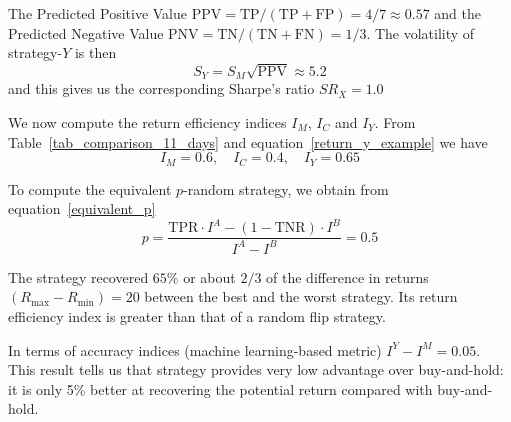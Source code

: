 \documentclass{article}
\begin{document}
The Predicted Positive Value $\text{PPV}=\text{TP}/(\text{TP}+\text{FP})=4/7\approx 0.57$ and the Predicted Negative Value
$\text{PNV}=\text{TN}/(\text{TN} + \text{FN}) = 1/3$.
The volatility of strategy-$Y$ is then
\begin{equation}
S_{Y}=S_{M} \sqrt{ \text{PPV}}\approx 5.2
\end{equation}
and this gives us the corresponding Sharpe's ratio $SR_{X}=1.0$


We now compute the return efficiency indices $I_{M}$, $I_{C}$ and $I_{Y}$.
From Table~\ref{tab_comparison_11_days} and equation~\eqref{return_y_example} we have
\begin{equation*}
I_{M} %
=0.6, \quad
I_{C}  %
=0.4,\quad
I_{Y} %
=0.65
\label{accuracy_index_benchmark_y}
\end{equation*}

\begin{comment}
The return efficiency index for strategy $Y$ 
\begin{equation*}
I^{Y} = \frac{R^{Y}-R^{\min}}{R^{\max}-R^{\min}}=\frac{13}{20}=0.65
\label{accuracy_as_benchmarks_y}
\end{equation*}
\end{comment}

To compute the equivalent $p$-random strategy, we obtain from equation~\eqref{equivalent_p}
\begin{equation*}
p=\frac{\text{TPR}\cdot I^{A}-(1-\text{TNR})\cdot I^{B}}{I^{A}-I^{B}}=0.5
\end{equation*}


The strategy recovered $65\%$ or about $2/3$ of the difference in returns $(R_{\max}-R_{\min})=20$ between the best and the worst strategy. Its return efficiency index is greater than that of a random flip strategy.

\begin{comment}
\begin{equation*}
R^{Y} \approx \text{TP}\cdot r^{+} + \text{FP}\cdot r^{-} = 4r^{+}+2r^{-} =4
\end{equation*}
The real value for return is $R_{y}=5$
\end{comment}
In terms of accuracy indices (machine learning-based metric)
$I^{Y}-I^{M}=0.05$. This result tells us that strategy provides very low advantage over buy-and-hold: it is only 5\% better at recovering the potential return compared with buy-and-hold.
\end{document}
